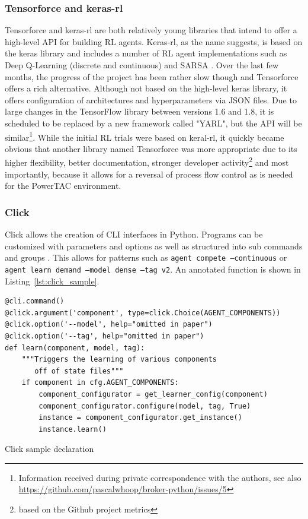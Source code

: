 \subsubsection{Tensorforce and keras-rl}%
\label{sub:tensorforce_and_keras_rl}

Tensorforce and keras-rl are both relatively young libraries that intend to offer a high-level \ac{API} for building
\ac{RL} agents. Keras-rl, as the name suggests, is based on the keras library and includes a number of \ac{RL} agent
implementations such as Deep Q-Learning (discrete and continuous) and \ac{SARSA} \cite[]{plappert2016kerasrl}. Over the
last few months, the progress of the project has been rather slow though and Tensorforce offers a rich alternative.
Although not based on the high-level keras library, it offers configuration of architectures and hyperparameters via
\ac{JSON} files. Due to large changes in the TensorFlow library between versions 1.6 and 1.8, it is scheduled to be
replaced by a new framework called "YARL", but the \ac{API} will be similar\footnote{Information received during private
    correspondence with the authors, see also
\url{https://github.com/pascalwhoop/broker-python/issues/5}}. While the initial \ac{RL} trials were based on 
keral-rl, it quickly became obvious that another library named Tensorforce was more appropriate due to its higher
flexibility, better documentation, stronger developer activity\footnote{based on the Github project metrics} and most
importantly, because it allows for a reversal of process flow control as is needed for the
\ac{PowerTAC} environment. 

\subsubsection{Click}%
\label{sub:click}

Click allows the creation of CLI interfaces in Python. Programs can be customized with parameters and options as well
as structured into sub commands and groups \citep{clickcli}. This allows for patterns such as \texttt{agent compete
--continuous} or \texttt{agent learn demand --model dense --tag v2}. An annotated function is shown in
Listing~\ref{lst:click_sample}.

\begin{listing}[h]
    \begin{verbatim}
@cli.command()
@click.argument('component', type=click.Choice(AGENT_COMPONENTS))
@click.option('--model', help="omitted in paper")
@click.option('--tag', help="omitted in paper")
def learn(component, model, tag):
    """Triggers the learning of various components
       off of state files"""
    if component in cfg.AGENT_COMPONENTS:
        component_configurator = get_learner_config(component)
        component_configurator.configure(model, tag, True)
        instance = component_configurator.get_instance()
        instance.learn()
    \end{verbatim}
    \caption{Click sample declaration}
    \label{lst:click_sample}
\end{listing}


